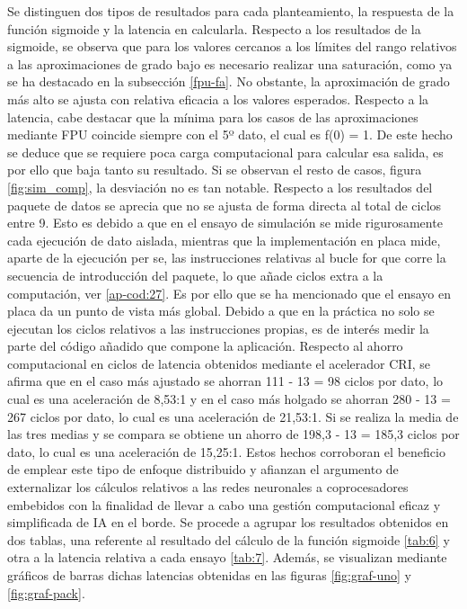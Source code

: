 Se distinguen dos tipos de resultados para cada planteamiento, la respuesta de la función sigmoide y la latencia en calcularla.
Respecto a los resultados de la sigmoide, se observa que para los valores cercanos a los límites del rango relativos a las aproximaciones de grado bajo es necesario realizar una saturación, como ya se ha destacado en la subsección \ref{fpu-fa}.
No obstante, la aproximación de grado más alto se ajusta con relativa eficacia a los valores esperados.
Respecto a la latencia, cabe destacar que la mínima para los casos de las aproximaciones mediante FPU coincide siempre con el 5º dato, el cual es f(0) = 1.
De este hecho se deduce que se requiere poca carga computacional para calcular esa salida, es por ello que baja tanto su resultado.
Si se observan el resto de casos, figura \ref{fig:sim_comp}, la desviación no es tan notable.
Respecto a los resultados del paquete de datos se aprecia que no se ajusta de forma directa al total de ciclos entre 9.
Esto es debido a que en el ensayo de simulación se mide rigurosamente cada ejecución de dato aislada, mientras que la implementación en placa mide, aparte de la ejecución per se, las instrucciones relativas al bucle for que corre la secuencia de introducción del paquete, lo que añade ciclos extra a la computación, ver \ref{ap-cod:27}.
Es por ello que se ha mencionado que el ensayo en placa da un punto de vista más global.
Debido a que en la práctica no solo se ejecutan los ciclos relativos a las instrucciones propias, es de interés medir la parte del código añadido que compone la aplicación.
Respecto al ahorro computacional en ciclos de latencia obtenidos mediante el acelerador CRI, se afirma que en el caso más ajustado se ahorran 111 - 13 = 98 ciclos por dato, lo cual es una aceleración de 8,53:1 y en el caso más holgado se ahorran 280 - 13 = 267 ciclos por dato, lo cual es una aceleración de 21,53:1.
Si se realiza la media de las tres medias y se compara se obtiene un ahorro de 198,3 - 13 = 185,3 ciclos por dato, lo cual es una aceleración de 15,25:1.
Estos hechos corroboran el beneficio de emplear este tipo de enfoque distribuido y afianzan el argumento de externalizar los cálculos relativos a las redes neuronales a coprocesadores embebidos con la finalidad de llevar a cabo una gestión computacional eficaz y simplificada de IA en el borde.
Se procede a agrupar los resultados obtenidos en dos tablas, una referente al resultado del cálculo de la función sigmoide \ref{tab:6} y otra a la latencia relativa a cada ensayo \ref{tab:7}.
Además, se visualizan mediante gráficos de barras dichas latencias obtenidas en las figuras \ref{fig:graf-uno} y \ref{fig:graf-pack}.

